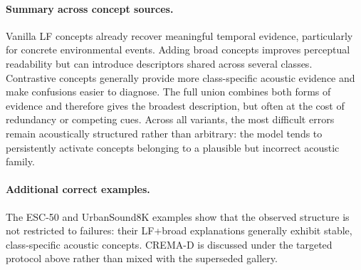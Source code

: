 \documentclass[10pt]{article}
\begin{document}
\paragraph{Summary across concept sources.}
Vanilla LF concepts already recover meaningful temporal evidence, particularly for concrete environmental events. Adding broad concepts improves perceptual readability but can introduce descriptors shared across several classes. Contrastive concepts generally provide more class-specific acoustic evidence and make confusions easier to diagnose. The full union combines both forms of evidence and therefore gives the broadest description, but often at the cost of redundancy or competing cues. Across all variants, the most difficult errors remain acoustically structured rather than arbitrary: the model tends to persistently activate concepts belonging to a plausible but incorrect acoustic family.

\paragraph{Additional correct examples.}
The ESC-50 and UrbanSound8K examples show that the observed structure is not restricted to failures: their LF+broad explanations generally exhibit stable, class-specific acoustic concepts. CREMA-D is discussed under the targeted protocol above rather than mixed with the superseded gallery.
\end{document}
